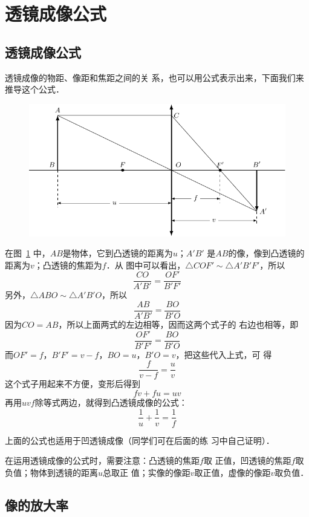 \section{透镜成像公式}\label{sec_C_5-12}

\subsection{透镜成像公式}

透镜成像的物距、像距和焦距之间的关
系，也可以用公式表示出来，下面我们来推导这个公式．
\begin{figure}[htbp]
    \centering
    \includegraphics{fig/C/5-47.pdf}
    \caption{}\label{fig_C_5-47}
\end{figure}

在图~\ref{fig_C_5-47} 中，$AB$是物体，它到凸透镜的距离为$u$；$A'B'$
是$AB$的像，像到凸透镜的距离为$v$；凸透镜的焦距为$f$．从
图中可以看出，$\triangle COF'  \sim   \triangle A'B'F'$，所以
\[\frac{CO}{A'B'}=\frac{OF'}{B'F'}  \]
另外，$\triangle ABO \sim \triangle A'B'O$，所以
\[\frac{AB}{A'B'}=\frac{BO}{B'O} \]
因为$CO=AB$，所以上面两式的左边相等，因而这两个式子的
右边也相等，即
\[\frac{OF'}{B'F'}=\frac{BO}{B'O} \]
而$OF'=f$，$B'F'=v-f$，$BO=u$，$B'O=v$，把这些代入上式，可
得
\[\frac{f}{v-f}=\frac{u}{v} \]
这个式子用起来不方便，变形后得到
\[fv+fu=uv \]
再用$uvf$除等式两边，就得到凸透镜成像的公式：
\[\frac{1}{u}+\frac{1}{v}=\frac{1}{f}  \]

上面的公式也适用于凹透镜成像（同学们可在后面的练
习中自己证明）．

在运用透镜成像的公式时，需要注意：凸透镜的焦距$f$取
正值，凹透镜的焦距$f$取负值；物体到透镜的距离$u$总取正
值；实像的像距$v$取正值，虚像的像距$v$取负值．

\subsection{像的放大率}

